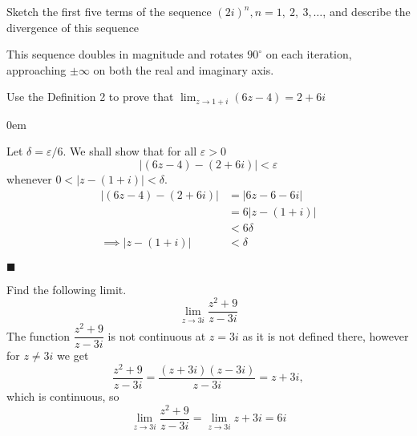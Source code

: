 \documentclass[12pt]{article}
\author{Warren Atkison}
\date{\today}
\renewcommand{\qed}{\hfill$\blacksquare$}
\renewenvironment{proof}{\vspace{1em}\begin{addmargin}[2em]{0em}\begin{newproof}}{\end{newproof}\end{addmargin}\qed}
\newenvironment{exercise}[2][Exercise]{\begin{trivlist}
\item[\hskip \labelsep {\bfseries #1} \hskip \labelsep {\bfseries #2.}]}{\end{trivlist}}
\begin{document}
\fancyhf{}
\fancyhead[R]{\today}
\fancyfoot[R]{\thepage}

\begin{exercise}{2}
	Sketch the first five terms of the sequence $(2i)^n, n = 1,~2,~3,\ldots$, and describe the divergence of this sequence
\end{exercise}
\begin{center}
\end{center}
This sequence doubles in magnitude and rotates $90^{\circ}$ on each iteration, approaching $\pm \infty$ on both the real and imaginary axis.
\begin{exercise}{8}
	Use the Definition 2 to prove that $\lim_{z \to 1 + i} (6z - 4) = 2 + 6i$
\end{exercise}	
\begin{proof} Let $\delta = \varepsilon/6$. We shall show that for all $\varepsilon > 0$
	\[
		|(6z - 4) - (2 + 6i)| < \varepsilon
	\]
	whenever $0 < |z - (1 + i)| < \delta$.
	\begin{align*}
		|(6z - 4) - (2 + 6i)| &= |6z - 6 - 6i| \\ &= 6|z - (1 + i)| \\
						      &< 6\delta \\
				\implies |z - (1 + i)| &< \delta
	\end{align*}
\end{proof}
\begin{exercise}{11c}
	Find the following limit.
	\[
		\lim_{z \to 3i} \frac{z^2 + 9}{z - 3i}
	\]
	The function $\dfrac{z^2 + 9}{z - 3i}$ is not continuous at $z = 3i$ as it is not defined there, however for $z \neq 3i$ we get
	\[
		\frac{z^2 + 9}{z - 3i} = \frac{(z + 3i)(z - 3i)}{z - 3i} = z + 3i,	
	\]
	which is continuous, so
	\[
		\lim_{z \to 3i} \frac{z^2 + 9}{z - 3i} = \lim_{z \to 3i} z + 3i = 6i
	\]
\end{exercise}	
\end{document}
